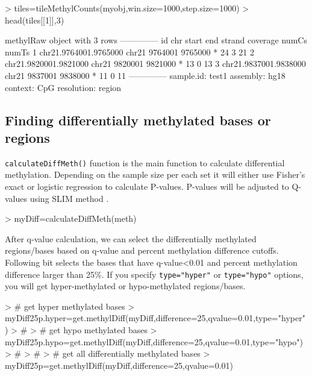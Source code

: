 \documentclass{article}
\begin{document}
\begin{Schunk}
\begin{Sinput}
> tiles=tileMethylCounts(myobj,win.size=1000,step.size=1000)
> head(tiles[[1]],3)
\end{Sinput}
\begin{Soutput}
methylRaw object with 3 rows
--------------
                     id   chr   start     end strand coverage numCs numTs
1 chr21.9764001.9765000 chr21 9764001 9765000      *       24     3    21
2 chr21.9820001.9821000 chr21 9820001 9821000      *       13     0    13
3 chr21.9837001.9838000 chr21 9837001 9838000      *       11     0    11
--------------
sample.id: test1 
assembly: hg18 
context: CpG 
resolution: region 
\end{Soutput}
\end{Schunk}

\subsection{Finding differentially methylated bases or regions}
\texttt{calculateDiffMeth()} function is the main function to calculate differential methylation. Depending on the sample size per each set it will either use Fisher's exact or logistic regression to calculate P-values. P-values will be adjusted to Q-values using SLIM method \cite{Wang2011a}.
\begin{Schunk}
\begin{Sinput}
> myDiff=calculateDiffMeth(meth)
\end{Sinput}
\end{Schunk}

After q-value calculation, we can select the differentially methylated regions/bases based on q-value and percent methylation difference cutoffs. Following bit selects the bases that have q-value<0.01 and percent methylation difference larger than 25\%. If you specify \texttt{type="hyper"} or \texttt{type="hypo"} options, you will get hyper-methylated or hypo-methylated regions/bases.
\begin{Schunk}
\begin{Sinput}
> # get hyper methylated bases
> myDiff25p.hyper=get.methylDiff(myDiff,difference=25,qvalue=0.01,type="hyper")
> #
> # get hypo methylated bases
> myDiff25p.hypo=get.methylDiff(myDiff,difference=25,qvalue=0.01,type="hypo")
> #
> #
> # get all differentially methylated bases
> myDiff25p=get.methylDiff(myDiff,difference=25,qvalue=0.01)
\end{Sinput}
\end{Schunk}
\end{document}
